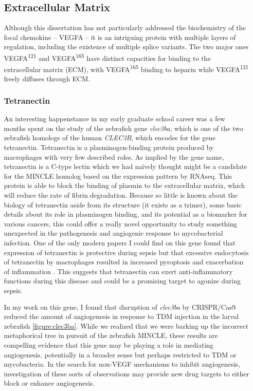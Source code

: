 \subsection{Extracellular Matrix}

Although this dissertation has not particularly addressed the biochemistry of the focal chemokine -- VEGFA -- it is an intriguing protein with multiple layers of regulation, including the existence of multiple splice variants. The two major ones VEGFA\textsuperscript{121} and VEGFA\textsuperscript{165} have distinct capacities for binding to the extracellular matrix (ECM), with VEGFA\textsuperscript{165} binding to heparin while VEGFA\textsuperscript{121} freely diffuses through ECM. 

\subsubsection{Tetranectin}

An interesting happenstance in my early graduate school career was a few months spent on the study of the zebrafish gene \textit{clec3ba}, which is one of the two zebrafish homologs of the human \textit{CLEC3B}, which encodes for the gene tetranectin. Tetranectin is a plasminogen-binding protein produced by macrophages with very few described roles. As implied by the gene name, tetranectin is a C-type lectin which we had na\"{i}vely thought might be a candidate for the MINCLE homolog based on the expression pattern by RNAseq. This protein is able to block the binding of plasmin to the extracellular matrix, which will reduce the rate of fibrin degradation. Because so little is known about the biology of tetranectin aside from its structure (it exists as a trimer), some basic details about its role in plasminogen binding, and its potential as a biomarker for various cancers, this could offer a really novel opportunity to study something unexpected in the pathogenesis and angiogenic response to mycobacterial infection. One of the only modern papers I could find on this gene found that expression of tetranectin is protective during sepsis but that excessive endocytosis of tetranectin by macrophages resulted in increased pyroptosis and exacerbation of inflammation \citep{Chen2020}. This suggests that tetranectin can exert anti-inflammatory functions during this disease and could be a promising target to agonize during sepsis.

In my work on this gene, I found that disruption of \textit{clec3ba} by CRISPR/Cas9 reduced the amount of angiogenesis in response to TDM injection in the larval zebrafish \autoref{figure:clec3ba}. While we realized that we were barking up the incorrect metaphorical tree in pursuit of the zebrafish MINCLE, these results are compelling evidence that this gene may be playing a role in mediating angiogenesis, potentially in a broader sense but perhaps restricted to TDM or mycobacteria. In the search for non-VEGF mechanisms to inhibit angiogenesis, investigation of these sorts of observations may provide new drug targets to either block or enhance angiogenesis. 


